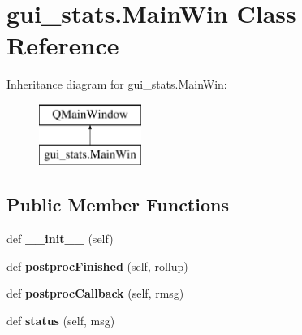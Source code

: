 \hypertarget{classgui__stats_1_1_main_win}{}\section{gui\+\_\+stats.\+Main\+Win Class Reference}
\label{classgui__stats_1_1_main_win}
Inheritance diagram for gui\+\_\+stats.\+Main\+Win\+:\begin{figure}[H]
\begin{center}
\leavevmode
\includegraphics[height=2.000000cm]{d2/d99/classgui__stats_1_1_main_win}
\end{center}
\end{figure}
\subsection*{Public Member Functions}
\begin{DoxyCompactItemize}
\item 
\mbox{\label{classgui__stats_1_1_main_win_af642ff02d4755574bca9e286798b939f}} 
def {\bfseries \+\_\+\+\_\+init\+\_\+\+\_\+} (self)
\item 
\mbox{\label{classgui__stats_1_1_main_win_ae99aadcd38bee7a6cca7df912afc0e8f}} 
def {\bfseries postproc\+Finished} (self, rollup)
\item 
\mbox{\label{classgui__stats_1_1_main_win_ade135342372f02ff9ec68054721e3446}} 
def {\bfseries postproc\+Callback} (self, rmsg)
\item 
\mbox{\label{classgui__stats_1_1_main_win_a12aa5bc5f24063f4fbd8860e986a98a1}} 
def {\bfseries status} (self, msg)
\end{DoxyCompactItemize}
